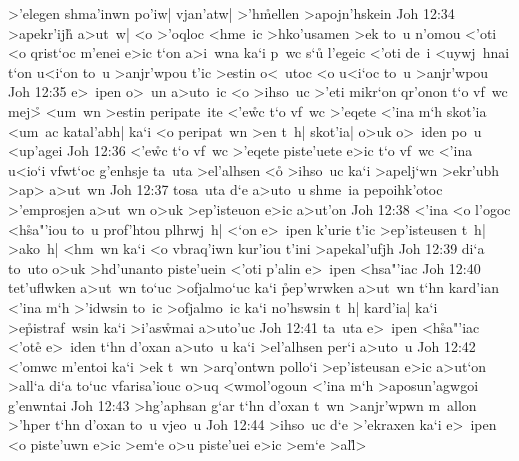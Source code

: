 >'elegen
shma'inwn
po'iw|
vjan'atw|
>'h\r{m}ellen
>apojn'hskein\bibvsend
\vs Joh 12:34
>apekr'ij\r{h}
a>ut~w|
<o
>'oqloc
<hme~ic
>hko'usamen
>ek
to~u
n'omou
<'oti
<o
qrist`oc
m'enei
e>ic
t`on
a>i~wna
ka`i
p~wc
s`u\r{}
l'egeic
<'oti
de~i
<uywj~hnai
t`on
u<i`on
to~u
>anjr'wpou
t'ic
>estin
o<~utoc
<o
u<i`oc
to~u
>anjr'wpou\bibvsend
\vs Joh 12:35
e>~ipen
o>~un
a>uto~ic
<o
>ihso~uc
>'eti
mikr`on
qr'onon
t`o
vf~wc
mej>\r{}
<um~wn
>estin
peripate~ite
<'e\r{w}c
t`o
vf~wc
>'eqete
<'ina
m`h
skot'ia
<um~ac
katal'abh|
ka`i
<o
peripat~wn
>en
t~h|
skot'ia|
o>uk
o>~iden
po~u
<up'agei\bibvsend
\vs Joh 12:36
<'e\r{w}c
t`o
vf~wc
>'eqete
piste'uete
e>ic
t`o
vf~wc
<'ina
u<io`i
vfwt`oc
g'enhsje
ta~uta
>el'alhsen
<o\r{}
>ihso~uc
ka`i
>apelj`wn
>ekr'ubh
>ap>
a>ut~wn\bibvsend
\vs Joh 12:37
tosa~uta
d`e
a>uto~u
shme~ia
pepoihk'otoc
>'emprosjen
a>ut~wn
o>uk
>ep'isteuon
e>ic
a>ut'on\bibvsend
\vs Joh 12:38
<'ina
<o
l'ogoc
<h\r{s}a"'iou
to~u
prof'htou
plhrwj~h|
<`on
e>~ipen
k'urie
t'ic
>ep'isteusen
t~h|
>ako~h|
<hm~wn
ka`i
<o
vbraq'iwn
kur'iou
t'ini
>apekal'ufjh\bibvsend
\vs Joh 12:39
di`a
to~uto
o>uk
>hd'unanto
piste'uein
<'oti
p'alin
e>~ipen
<hsa"'iac\bibvsend
{}
\vs Joh 12:40
tet'uflwken
a>ut~wn
to`uc
>ofjalmo`uc
ka`i
\r{p}ep'wrwken
a>ut~wn
t`hn
kard'ian
<'ina
m`h
>'idwsin
to~ic
>ofjalmo~ic
ka`i
no'hswsin
t~h|
kard'ia|
ka`i
>e\r{p}istraf~wsin
ka`i
>i'as\r{w}mai
a>uto'uc\bibvsend
\vs Joh 12:41
ta~uta
e>~ipen
<h\r{s}a"'iac
<'ot\r{e}
e>~iden
t`hn
d'oxan
a>uto~u
ka`i
>el'alhsen
per`i
a>uto~u\bibvsend
\vs Joh 12:42
<'omwc
m'entoi
ka`i
>ek
t~wn
>arq'ontwn
pollo`i
>ep'isteusan
e>ic
a>ut`on
>all`a
di`a
to`uc
vfarisa'iouc
o>uq
<wmol'ogoun
<'ina
m`h
>aposun'agwgoi
g'enwntai\bibvsend
\vs Joh 12:43
>hg'aphsan
g`ar
t`hn
d'oxan
t~wn
>anjr'wpwn
m~allon
>'hper
t`hn
d'oxan
to~u
vjeo~u\bibvsend
\vs Joh 12:44
>ihso~uc
d`e
>'ekraxen
ka`i
e>~ipen
<o
piste'uwn
e>ic
>em`e
o>u
piste'uei
e>ic
>em`e
>al\r{l}>

